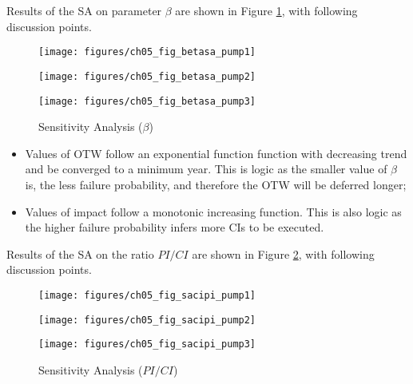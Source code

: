 Results of the SA on parameter $\beta$ are shown in Figure \ref{ch05_fig_sa_m}, with following discussion points.


\begin{figure}[!htb]
	\begin{minipage}[b]{0.5\linewidth}
		\centering
		\texttt{[image: figures/ch05\_fig\_betasa\_pump1]}
		\caption*{a - BP\#1}
	\end{minipage}
	\hspace{0.05cm}
	\begin{minipage}[b]{0.5\linewidth}
		\centering
		\texttt{[image: figures/ch05\_fig\_betasa\_pump2]}
		\caption*{b - BP\#2}
	\end{minipage}
	\hspace{0.05cm}
	\begin{minipage}[b]{0.5\linewidth}
		\centering
		\texttt{[image: figures/ch05\_fig\_betasa\_pump3]}
		\caption*{c - BP\#3}
	\end{minipage}

	\caption{Sensitivity Analysis ($\beta$)}
	\label{ch05_fig_sa_m}
\end{figure}

\begin{itemize}
	\item Values of OTW follow an exponential function function with decreasing trend and be converged to a minimum year. This is logic as the smaller value of $\beta$ is, the less failure probability, and therefore the OTW will be deferred longer;
	\item Values of impact follow a monotonic increasing function. This is also logic as the higher failure probability infers more CIs to be executed.
\end{itemize}

Results of the SA on the ratio $PI/CI$ are shown in Figure \ref{ch05_fig_sa_cipi}, with following discussion points.


\begin{figure}[!htb]
	\begin{minipage}[b]{0.5\linewidth}
		\centering
		\texttt{[image: figures/ch05\_fig\_sacipi\_pump1]}
		\caption*{a - BP\#1}
	\end{minipage}
	\hspace{0.05cm}
	\begin{minipage}[b]{0.5\linewidth}
		\centering
		\texttt{[image: figures/ch05\_fig\_sacipi\_pump2]}
		\caption*{b - BP\#2}
	\end{minipage}
	\hspace{0.05cm}
	\begin{minipage}[b]{0.5\linewidth}
		\centering
		\texttt{[image: figures/ch05\_fig\_sacipi\_pump3]}
		\caption*{c - BP\#3}
	\end{minipage}
	\caption{Sensitivity Analysis ($PI/CI$)}
	\label{ch05_fig_sa_cipi}
\end{figure}

